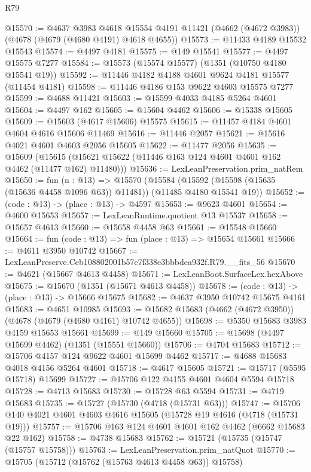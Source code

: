 \begin{lexlean}{R79}
\begin{coremodule}
@15570 := @4637
    @3983
    @4618
    @15554
    @4191
    @11421
    (@4662 (@4672 @3983))
    (@4678 (@4679 (@4680 @4191) @4618 @4655))
@15573 := @11433 @4189 @15532 @15543
@15574 := @4497 @4181
@15575 := @149 @15541
@15577 := @4497 @15575 @7277
@15584 := @15573 (@15574 @15577) (@1351 (@10750 @4180 @15541 @19))
@15592 := @11446 @4182 @4188 @4601 @9624 @4181 @15577 (@11454 @4181)
@15598 := @11446 @4186 @153 @9622 @4603 @15575 @7277
@15599 := @4688 @11421
@15603 := @15599 @4033 @4185 @5264 @4601
@15604 := @4497 @162
@15605 := @15604 @4462
@15606 := @15338 @15605
@15609 := @15603 (@4617 @15606) @15575
@15615 := @11457 @4184 @4601 @4604 @4616 @15606 @11469
@15616 := @11446 @2057
@15621 := @15616 @4021 @4601 @4603 @2056 @15605
@15622 := @11477 @2056
@15635 := @15609
    (@15615 (@15621 @15622 (@11446 @163 @124 @4601 @4601 @162 @4462 (@11477 @162) @11480)))
@15636 := LexLeanPreservation.prim_natRem
@15650 := fun (n : @13) =>
  @15570
    (@15584 (@15592 (@15598 (@15635 (@15636 @4458 @1096 @63)) @11481)) (@11485 @4180 @15541 @19))
@15652 := (code : @13) -> (place : @13) -> @4597
@15653 := @9623 @4601
@15654 := @4600 @15653
@15657 := LexLeanRuntime.quotient @13 @15537
@15658 := @15657 @4613
@15660 := @15658 @4458 @63
@15661 := @15548 @15660
@15664 := fun (code : @13) => fun (place : @13) => @15654 @15661
@15666 := @4611 @3950 @10742
@15667 := LexLeanPreserve.Ceb108802001b57e7f338e3bbbdea932f.R79.__fits_56
@15670 := @4621 (@15667 @4613 @4458)
@15671 := LexLeanBoot.SurfaceLex.hexAbove
@15675 := @15670 (@1351 (@15671 @4613 @4458))
@15678 := (code : @13) -> (place : @13) -> @15666 @15675
@15682 := @4637 @3950 @10742 @15675 @4161
@15683 := @4651 @10985
@15693 := @15682 @15683 (@4662 (@4672 @3950)) (@4678 (@4679 (@4680 @4161) @10742 @4655))
@15698 := @5350 @15683 @3983 @4159 @15653 @15661
@15699 := @149 @15660
@15705 := @15698 (@4497 @15699 @4462) (@1351 (@15551 @15660))
@15706 := @4704 @15683
@15712 := @15706 @4157 @124 @9622 @4601 @15699 @4462
@15717 := @4688 @15683 @4018 @4156 @5264 @4601
@15718 := @4617 @15605
@15721 := @15717 (@5595 @15718) @15699
@15727 := @15706 @122 @4155 @4601 @4604 @5594 @15718
@15728 := @4713 @15683
@15730 := @15728 @63 @5594
@15731 := @4719 @15683
@15735 := @15727 (@15730 (@4718 (@15731 @63)))
@15747 := @15706 @140 @4021 @4601 @4603 @4616 @15605 (@15728 @19 @4616 (@4718 (@15731 @19)))
@15757 := @15706 @163 @124 @4601 @4601 @162 @4462 (@6662 @15683 @22 @162)
@15758 := @4738 @15683
@15762 := @15721 (@15735 (@15747 (@15757 @15758)))
@15763 := LexLeanPreservation.prim_natQuot
@15770 := @15705 (@15712 (@15762 (@15763 @4613 @4458 @63)) @15758)

\end{coremodule}
\end{lexlean}
